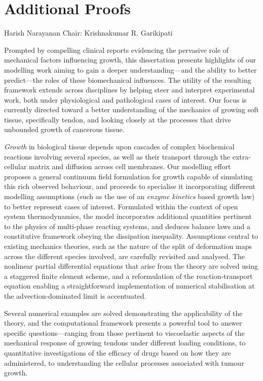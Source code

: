 \documentclass[leqno]{report}
\begin{document}
\startappendices
\chapter{Additional Proofs}
\label{additional-proofs}




 {Harish Narayanan} {Chair: Krishnakumar
  R. Garikipati}

Prompted by compelling clinical reports evidencing the pervasive role
of mechanical factors influencing growth, this dissertation presents
highlights of our modelling work aiming to gain a deeper
understanding---and the ability to better predict---the roles of these
biomechanical influences. The utility of the resulting framework
extends across disciplines by helping steer and interpret experimental
work, both under physiological and pathological cases of interest. Our
focus is currently directed toward a better understanding of the
mechanics of growing soft tissue, specifically tendon, and looking
closely at the processes that drive unbounded growth of cancerous
tissue.

{\em Growth} in biological tissue depends upon cascades of complex
biochemical reactions involving several species, as well as their
transport through the extra-cellular matrix and diffusion across cell
membranes. Our modelling effort proposes a general continuum field
formulation for growth capable of simulating this rich observed
behaviour, and proceeds to specialise it incorporating different
modelling assumptions (such as the use of an {\sl enzyme kinetics}
based growth law) to better represent cases of interest. Formulated
within the context of open system thermodynamics, the model
incorporates additional quantities pertinent to the physics of
multi-phase reacting systems, and deduces balance laws and a
constitutive framework obeying the dissipation inequality. Assumptions
central to existing mechanics theories, such as the nature of the
split of deformation maps across the different species involved, are
carefully revisited and analysed. The nonlinear partial differential
equations that arise from the theory are solved using a staggered
finite element scheme, and a reformulation of the reaction-transport
equation enabling a straightforward implementation of numerical
stabilisation at the advection-dominated limit is accentuated.

Several numerical examples are solved demonstrating the applicability
of the theory, and the computational framework presents a powerful
tool to answer specific questions---ranging from those pertinent to
viscoelastic aspects of the mechanical response of growing tendons
under different loading conditions, to quantitative investigations of
the efficacy of drugs based on how they are administered, to
understanding the cellular processes associated with tumour growth.

\thispagestyle{empty}
\end{document}
